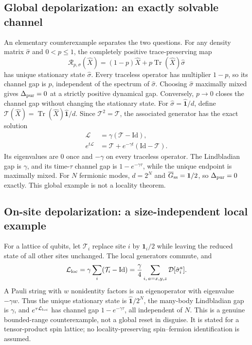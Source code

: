 \documentclass[aps,prb,twocolumn,nofootinbib,superscriptaddress]{revtex4-2}
\newcommand{\Id}{\hat{\mathbf{1}}}
\newcommand{\id}{\mathbf{1}}
\newcommand{\Tr}{\operatorname{Tr}}
\newcommand{\D}{\mathcal D}
\newcommand{\Lind}{\mathcal L}
\begin{document}
\subsection{Global depolarization: an exactly solvable channel}
An elementary counterexample separates the two questions. For any density
matrix $\hat\sigma$ and $0<p\le1$, the completely positive trace-preserving
map
\begin{equation}
 \mathcal R_{p,\sigma}(\hat X)
 =(1-p)\hat X+p\Tr(\hat X)\hat\sigma
 \label{eq:replacement}
\end{equation}
has unique stationary state $\hat\sigma$. Every traceless operator has
multiplier $1-p$, so its channel gap is $p$, independent of the spectrum
of $\hat\sigma$. Choosing $\hat\sigma$ maximally mixed gives
$\Delta_{\rm pur}=0$ at a strictly positive dynamical gap. Conversely,
$p\to0$ closes the channel gap without changing the stationary state.
For $\hat\sigma=\Id/d$, define $\mathcal T(\hat X)=\Tr(\hat X)\Id/d$.
Since $\mathcal T^2=\mathcal T$, the associated generator has the exact
solution
\begin{align}
 \Lind&=\gamma(\mathcal T-\mathrm{Id}),\nonumber\\
 e^{t\Lind}&=\mathcal T+e^{-\gamma t}(\mathrm{Id}-\mathcal T).
\end{align}
Its eigenvalues are $0$ once and $-\gamma$ on every traceless operator.
The Lindbladian gap is $\gamma$, and its time-$\tau$ channel gap is
$1-e^{-\gamma\tau}$, while the unique endpoint is maximally mixed.
For $N$ fermionic modes, $d=2^N$ and $\overline G_{\rm ss}=\id/2$,
so $\Delta_{\rm pur}=0$ exactly. This global example is not a locality
theorem.

\subsection{On-site depolarization: a size-independent local example}
For a lattice of qubits, let $\mathcal T_i$ replace site $i$ by
$\Id_i/2$ while leaving the reduced state of all other sites unchanged.
The local generators commute, and
\begin{equation}
 \Lind_{\rm loc}=\gamma\sum_i(\mathcal T_i-\mathrm{Id})
 =\frac{\gamma}{4}\sum_{i,\,a=x,y,z}\D[\hat\sigma_i^a].
\end{equation}
A Pauli string with $w$ nonidentity factors is an eigenoperator with
eigenvalue $-\gamma w$. Thus the unique stationary state is
$\Id/2^N$, the many-body Lindbladian gap is $\gamma$, and
$e^{\tau\Lind_{\rm loc}}$ has channel gap $1-e^{-\gamma\tau}$,
all independent of $N$. This is a genuine bounded-range counterexample,
not a global reset in disguise. It is stated for a tensor-product spin
lattice; no locality-preserving spin--fermion identification is assumed.
\end{document}
